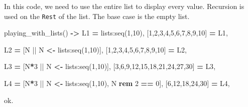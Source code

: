 \documentclass[
]{book}
\newenvironment{Shaded}{\begin{snugshade}}{\end{snugshade}}
\newcommand{\CharTok}[1]{\textcolor[rgb]{0.31,0.60,0.02}{#1}}
\newcommand{\DecValTok}[1]{\textcolor[rgb]{0.00,0.00,0.81}{#1}}
\newcommand{\FunctionTok}[1]{\textcolor[rgb]{0.00,0.00,0.00}{#1}}
\newcommand{\OperatorTok}[1]{\textcolor[rgb]{0.81,0.36,0.00}{\textbf{#1}}}
\newcommand{\VariableTok}[1]{\textcolor[rgb]{0.00,0.00,0.00}{#1}}
\begin{document}
In this code, we need to use the entire list to display every value. Recursion is used on the \texttt{Rest} of the list. The base case is the empty list.

\begin{Shaded}
\begin{Highlighting}[]
\FunctionTok{playing\_with\_lists()} \OperatorTok{{-}\textgreater{}}
    \VariableTok{L1} \OperatorTok{=} \FunctionTok{lists:seq(}\DecValTok{1}\FunctionTok{,}\DecValTok{10}\FunctionTok{),}
    \FunctionTok{[}\DecValTok{1}\FunctionTok{,}\DecValTok{2}\FunctionTok{,}\DecValTok{3}\FunctionTok{,}\DecValTok{4}\FunctionTok{,}\DecValTok{5}\FunctionTok{,}\DecValTok{6}\FunctionTok{,}\DecValTok{7}\FunctionTok{,}\DecValTok{8}\FunctionTok{,}\DecValTok{9}\FunctionTok{,}\DecValTok{10}\FunctionTok{]} \OperatorTok{=} \VariableTok{L1}\FunctionTok{,}
    
    \VariableTok{L2} \OperatorTok{=} \FunctionTok{[}\VariableTok{N} \FunctionTok{||} \VariableTok{N} \OperatorTok{\textless{}{-}} \FunctionTok{lists:seq(}\DecValTok{1}\FunctionTok{,}\DecValTok{10}\FunctionTok{)],}
    \FunctionTok{[}\DecValTok{1}\FunctionTok{,}\DecValTok{2}\FunctionTok{,}\DecValTok{3}\FunctionTok{,}\DecValTok{4}\FunctionTok{,}\DecValTok{5}\FunctionTok{,}\DecValTok{6}\FunctionTok{,}\DecValTok{7}\FunctionTok{,}\DecValTok{8}\FunctionTok{,}\DecValTok{9}\FunctionTok{,}\DecValTok{10}\FunctionTok{]} \OperatorTok{=} \VariableTok{L2}\FunctionTok{,}

    \VariableTok{L3} \OperatorTok{=} \FunctionTok{[}\VariableTok{N}\OperatorTok{*}\DecValTok{3} \FunctionTok{||} \VariableTok{N} \OperatorTok{\textless{}{-}} \FunctionTok{lists:seq(}\DecValTok{1}\FunctionTok{,}\DecValTok{10}\FunctionTok{)],}
    \FunctionTok{[}\DecValTok{3}\FunctionTok{,}\DecValTok{6}\FunctionTok{,}\DecValTok{9}\FunctionTok{,}\DecValTok{12}\FunctionTok{,}\DecValTok{15}\FunctionTok{,}\DecValTok{18}\FunctionTok{,}\DecValTok{21}\FunctionTok{,}\DecValTok{24}\FunctionTok{,}\DecValTok{27}\FunctionTok{,}\DecValTok{30}\FunctionTok{]} \OperatorTok{=} \VariableTok{L3}\FunctionTok{,}

    \VariableTok{L4} \OperatorTok{=} \FunctionTok{[}\VariableTok{N}\OperatorTok{*}\DecValTok{3} \FunctionTok{||} \VariableTok{N} \OperatorTok{\textless{}{-}} \FunctionTok{lists:seq(}\DecValTok{1}\FunctionTok{,}\DecValTok{10}\FunctionTok{),} \VariableTok{N} \OperatorTok{rem} \DecValTok{2} \OperatorTok{==} \DecValTok{0}\FunctionTok{],}
    \FunctionTok{[}\DecValTok{6}\FunctionTok{,}\DecValTok{12}\FunctionTok{,}\DecValTok{18}\FunctionTok{,}\DecValTok{24}\FunctionTok{,}\DecValTok{30}\FunctionTok{]} \OperatorTok{=} \VariableTok{L4}\FunctionTok{,}
    
    \CharTok{ok}\FunctionTok{.}
\end{Highlighting}
\end{Shaded}
\end{document}
